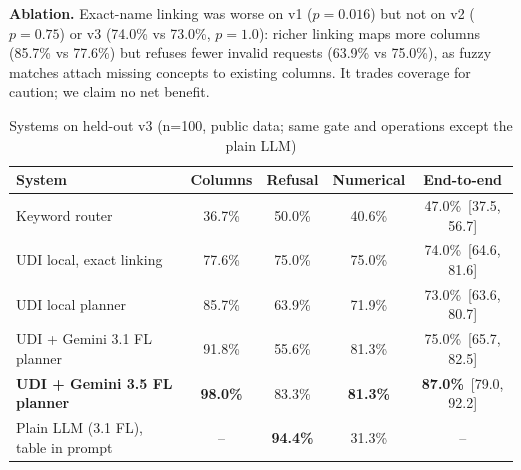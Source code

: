 \documentclass[conference]{IEEEtran}
\newcommand{\ci}[2]{\,{\scriptsize[#1, #2]}}
\begin{document}
\textbf{Ablation.} Exact-name linking was worse on v1 ($p=0.016$) but not on v2 ($p=0.75$) or v3 (74.0\% vs 73.0\%, $p=1.0$): richer linking maps more columns (85.7\% vs 77.6\%) but refuses fewer invalid requests (63.9\% vs 75.0\%), as fuzzy matches attach missing concepts to existing columns. It trades coverage for caution; we claim no net benefit.

\begin{table}[t]
\caption{Systems on held-out v3 (n=100, public data; same gate and operations except the plain LLM)}
\label{tab:cmp}
\centering\scriptsize
\setlength{\tabcolsep}{2pt}
\begin{tabular}{lcccc}
\toprule
System & Columns & Refusal & Numerical & End-to-end\\
\midrule
Keyword router & 36.7\% & 50.0\% & 40.6\% & 47.0\% \ci{37.5}{56.7}\\
UDI local, exact linking & 77.6\% & 75.0\% & 75.0\% & 74.0\% \ci{64.6}{81.6}\\
UDI local planner & 85.7\% & 63.9\% & 71.9\% & 73.0\% \ci{63.6}{80.7}\\
UDI + Gemini 3.1 FL planner & 91.8\% & 55.6\% & 81.3\% & 75.0\% \ci{65.7}{82.5}\\
\textbf{UDI + Gemini 3.5 FL planner} & \textbf{98.0\%} & 83.3\% & \textbf{81.3\%} & \textbf{87.0\%} \ci{79.0}{92.2}\\
Plain LLM (3.1 FL), table in prompt & -- & \textbf{94.4\%} & 31.3\% & --\\
\bottomrule
\end{tabular}
\end{table}

\begin{table}[t]
\caption{Selected models on public data: CV on the training split; hold-out metrics with bootstrap 95\% CIs; macro-averaged F1}
\label{tab:ml}
\centering\scriptsize
\setlength{\tabcolsep}{4pt}
\end{table}
\end{document}
